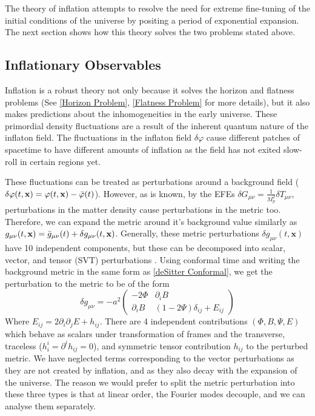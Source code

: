 \documentclass[aps,prd,reprint,preprintnumbers,showpacs,floatfix,nofootinbib,superscript address]{revtex4-2}
\begin{document}
The theory of inflation attempts to resolve the need for extreme fine-tuning of the initial conditions of the universe by positing a period of exponential expansion. The next section shows how this theory solves the two problems stated above.

\subsection{Inflationary Observables}  \label{Inflationary Observables}
Inflation is a robust theory not only because it solves the horizon and flatness problems (See \cref{Horizon Problem}, \cref{Flatness Problem} for more details), but it also makes predictions about the inhomogeneities in the early universe. These primordial density fluctuations are a result of the inherent quantum nature of the inflaton field. 
The fluctuations in the inflaton field $\delta\varphi$ cause different patches of spacetime to have different amounts of inflation as the field has not exited slow-roll in certain regions yet. 

These fluctuations can be treated as perturbations around a background field ($\delta\varphi(t,\textbf{x}) = \varphi(t,\textbf{x}) - \Bar{\varphi}(t)$). However, as is known, by the EFEs $\delta G_{\mu\nu} = \frac{1}{M_p^2}\delta T_{\mu \nu}$, perturbations in the matter density cause perturbations in the metric too. Therefore, we can expand the metric around it's background value similarly as $g_{\mu\nu}(t,\textbf{x}) = \Bar{g}_{\mu\nu}(t) + \delta g_{\mu\nu}(t,\textbf{x})$. Generally, these metric perturbations $\delta g_{\mu\nu}(t,\textbf{x})$ have 10 independent components, but these can be decomposed into scalar, vector, and tensor (SVT) perturbations \cite{liddle_cosmological_2000, malik_cosmological_2009}. Using conformal time and writing the background metric in the same form as \cref{deSitter Conformal}, we get the perturbation to the metric to be of the form
\begin{equation} \label{Perturbed metric}
    \delta g_{\mu\nu}
    = 
    -a^2
    \begin{pmatrix}
        -2 \Phi & \partial_iB \\
        \partial_iB & (1-2\Psi)\delta_{ij} + E_{ij} 
    \end{pmatrix}
\end{equation}
Where $E_{ij} = 2\partial_i\partial_j E + h_{ij}$. There are 4 independent contributions $(\Phi, B, \Psi, E)$ which behave as scalars under transformation of frames and the transverse, traceless ($h_i^i = \partial^ih_{ij} = 0$), and symmetric tensor contribution $h_{ij}$ to the perturbed metric. We have neglected terms corresponding to the vector perturbations as they are not created by inflation, and as they also decay with the expansion of the universe. The reason we would prefer to split the metric perturbation into these three types is that at linear order, the Fourier modes decouple, and we can analyse them separately. 
\end{document}
